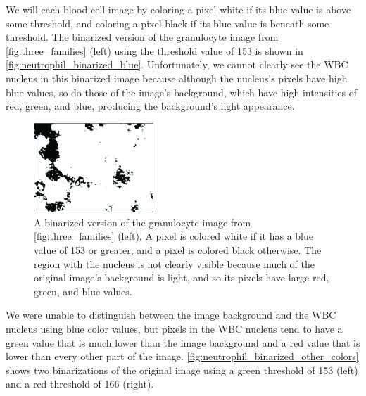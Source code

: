 We will  each blood cell image by coloring a pixel white if its blue value is above some threshold, and coloring a pixel black if its blue value is beneath some threshold. The binarized version of the granulocyte image from \autoref{fig:three_families} (left) using the threshold value of 153 is shown in \autoref{fig:neutrophil_binarized_blue}. Unfortunately, we cannot clearly see the WBC nucleus in this binarized image because although the nucleus's pixels have high blue values, so do those of the image's background, which have high intensities of red, green, and blue, producing the background's light appearance.\\

\begin{figure}[h]
\centering
\mySfFamily
\includegraphics[width = 0.4\textwidth]{../images_CMYK/neutrophil_binarized_blue}
\caption{A binarized version of the granulocyte image from \autoref{fig:three_families} (left). A pixel is colored white if it has a blue value of 153 or greater, and a pixel is colored black otherwise. The region with the nucleus is not clearly visible because much of the original image's background is light, and so its pixels have large red, green, and blue values.}
\label{fig:neutrophil_binarized_blue}
\end{figure}

\begin{qbox}\end{qbox}

We were unable to distinguish between the image background and the WBC nucleus using blue color values, but pixels in the WBC nucleus tend to have a green value that is much lower than the image background and a red value that is lower than every other part of the image. \autoref{fig:neutrophil_binarized_other_colors} shows two binarizations of the original image using a green threshold of 153 (left) and a red threshold of 166 (right).

